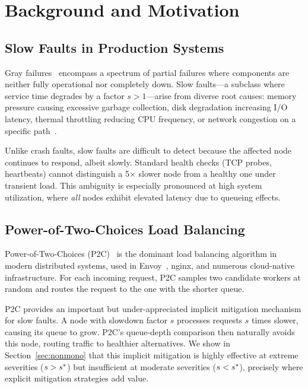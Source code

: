\section{Background and Motivation}
\label{sec:background}

\subsection{Slow Faults in Production Systems}

Gray failures~\cite{huang2017gray} encompass a spectrum of partial
failures where components are neither fully operational nor completely
down. Slow faults---a subclass where service time degrades by a factor
$s > 1$---arise from diverse root causes: memory pressure causing
excessive garbage collection, disk degradation increasing I/O latency,
thermal throttling reducing CPU frequency, or network congestion on a
specific path~\cite{gunawi2018fail}.

Unlike crash faults, slow faults are difficult to detect because the
affected node continues to respond, albeit slowly. Standard health
checks (TCP probes, heartbeats) cannot distinguish a 5$\times$ slower
node from a healthy one under transient load. This ambiguity is
especially pronounced at high system utilization, where \emph{all} nodes
exhibit elevated latency due to queueing effects.

\subsection{Power-of-Two-Choices Load Balancing}

Power-of-Two-Choices (P2C)~\cite{mitzenmacher2001power} is the dominant
load balancing algorithm in modern distributed systems, used in
Envoy~\cite{envoy}, nginx, and numerous cloud-native
infrastructure. For each incoming request, P2C samples two candidate
workers at random and routes the request to the one with the shorter
queue.

P2C provides an important but under-appreciated implicit mitigation
mechanism for slow faults. A node with slowdown factor $s$ processes
requests $s$ times slower, causing its queue to grow. P2C's queue-depth
comparison then naturally avoids this node, routing traffic to healthier
alternatives. We show in Section~\ref{sec:nonmono} that this implicit
mitigation is highly effective at extreme severities ($s > s^{*}$) but
insufficient at moderate severities ($s < s^{*}$), precisely where
explicit mitigation strategies add value.

